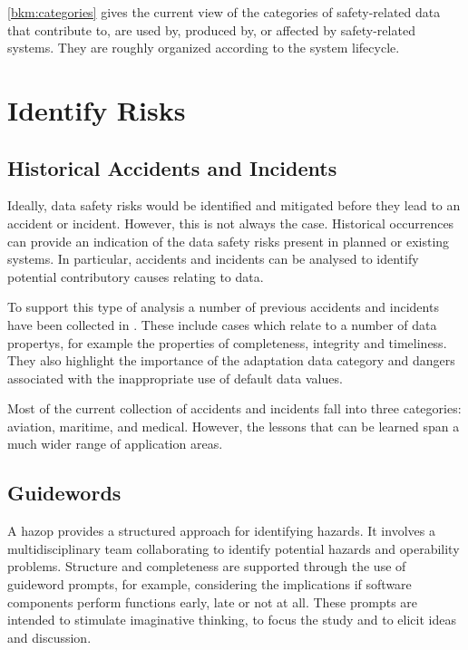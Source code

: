 \autoref{bkm:categories} gives the current view of the categories of safety-related data that contribute to, are used by, produced by, or affected by safety-related systems. They are roughly organized according to the system lifecycle. 
\section{Identify Risks}
\subsection{Historical Accidents and Incidents}
Ideally, data safety risks would be identified and mitigated before they lead to an accident or incident. However, this is not always the case. Historical occurrences can provide an indication of the data safety risks present in planned or existing systems. In particular, accidents and incidents can be analysed to identify potential contributory causes relating to data.

To support this type of analysis a number of previous accidents and incidents have been collected in .
These include cases which relate to a number of \glspl{data property},
for example the properties of \gls{completeness}, \gls{integrity} and \gls{timeliness}.
They also highlight the importance of the \gls{adaptation data} category and dangers associated with the inappropriate use of default data values.

Most of the current collection of accidents and incidents fall into three categories: aviation, maritime, and medical. However, the lessons that can be learned span a much wider range of application areas.

\subsection{ Guidewords}
A \gls{hazop} \cite{citation:iec61882:2016}
provides a structured approach for identifying hazards. It involves a multidisciplinary team collaborating to identify potential hazards and operability problems. Structure and \gls{completeness} are supported through the use of guideword prompts, for example, considering the implications if software components perform functions early, late or not at all. These prompts are intended to stimulate imaginative thinking, to focus the study and to elicit ideas and discussion.

